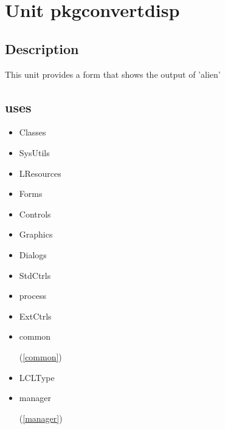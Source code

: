 \documentclass{report}
\begin{document}
\chapter{Unit pkgconvertdisp}
\label{pkgconvertdisp}
\section{Description}
This unit provides a form that shows the output of 'alien'
\section{uses}
\begin{itemize}
\item \begin{ttfamily}Classes\end{ttfamily}\item \begin{ttfamily}SysUtils\end{ttfamily}\item \begin{ttfamily}LResources\end{ttfamily}\item \begin{ttfamily}Forms\end{ttfamily}\item \begin{ttfamily}Controls\end{ttfamily}\item \begin{ttfamily}Graphics\end{ttfamily}\item \begin{ttfamily}Dialogs\end{ttfamily}\item \begin{ttfamily}StdCtrls\end{ttfamily}\item \begin{ttfamily}process\end{ttfamily}\item \begin{ttfamily}ExtCtrls\end{ttfamily}\item \begin{ttfamily}common\end{ttfamily}(\ref{common})\item \begin{ttfamily}LCLType\end{ttfamily}\item \begin{ttfamily}manager\end{ttfamily}(\ref{manager})\end{itemize}
\end{document}
